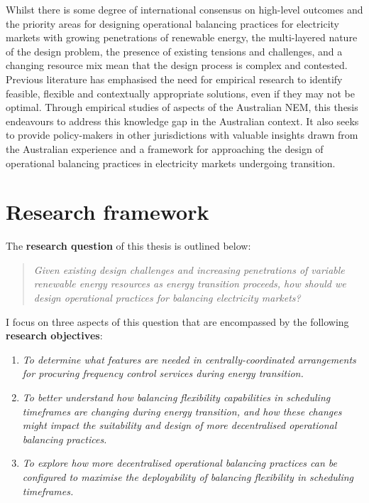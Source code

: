 \documentclass[12pt,a4paper,]{report}
\begin{document}
Whilst there is some degree of international consensus on high-level
outcomes and the priority areas for designing operational balancing
practices for electricity markets with growing penetrations of renewable
energy, the multi-layered nature of the design problem, the presence of
existing tensions and challenges, and a changing resource mix mean that
the design process is complex and contested. Previous literature has
emphasised the need for empirical research to identify feasible,
flexible and contextually appropriate solutions, even if they may not be
optimal. Through empirical studies of aspects of the Australian NEM,
this thesis endeavours to address this knowledge gap in the Australian
context. It also seeks to provide policy-makers in other jurisdictions
with valuable insights drawn from the Australian experience and a
framework for approaching the design of operational balancing practices
in electricity markets undergoing transition.

\hypertarget{sec:intro-research_framework}{%
\section{Research framework}\label{sec:intro-research_framework}}

The \textbf{research question} of this thesis is outlined below:

\begin{quote}
\emph{Given existing design challenges and increasing penetrations of
variable renewable energy resources as energy transition proceeds, how
should we design operational practices for balancing electricity
markets?}
\end{quote}

I focus on three aspects of this question that are encompassed by the
following \textbf{research objectives}:

\begin{enumerate}
\def\labelenumi{\arabic{enumi}.}
\item
  \emph{To determine what features are needed in centrally-coordinated
  arrangements for procuring frequency control services during energy
  transition.}
\item
  \emph{To better understand how balancing flexibility capabilities in
  scheduling timeframes are changing during energy transition, and how
  these changes might impact the suitability and design of more
  decentralised operational balancing practices.}
\item
  \emph{To explore how more decentralised operational balancing
  practices can be configured to maximise the deployability of balancing
  flexibility in scheduling timeframes.}
\end{enumerate}
\end{document}
